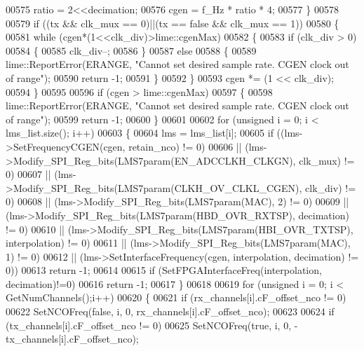 \begin{DoxyCode}
00575         ratio = 2<<decimation;
00576         cgen = f\_Hz * ratio * 4;
00577     \}
00578 
00579     \textcolor{keywordflow}{if} ((tx && clk\_mux == 0)||(tx == \textcolor{keyword}{false} && clk\_mux == 1))
00580     \{
00581         \textcolor{keywordflow}{while} (cgen*(1<<clk\_div)>lime::cgenMax)
00582         \{
00583             \textcolor{keywordflow}{if} (clk\_div > 0)
00584             \{
00585                 clk\_div--;
00586             \}
00587             \textcolor{keywordflow}{else}
00588             \{
00589                lime::ReportError(ERANGE, \textcolor{stringliteral}{"Cannot set desired sample rate. CGEN clock out of range"});
00590                \textcolor{keywordflow}{return} -1;
00591             \}
00592         \}
00593         cgen *= (1 << clk\_div);
00594     \}
00595 
00596     \textcolor{keywordflow}{if} (cgen > lime::cgenMax)
00597     \{
00598         lime::ReportError(ERANGE, \textcolor{stringliteral}{"Cannot set desired sample rate. CGEN clock out of range"});
00599         \textcolor{keywordflow}{return} -1;
00600     \}
00601 
00602     \textcolor{keywordflow}{for} (\textcolor{keywordtype}{unsigned} i = 0; i < lms_list.size(); i++)
00603       \{
00604         lms = lms_list[i];
00605         \textcolor{keywordflow}{if} ((lms->SetFrequencyCGEN(cgen, retain\_nco) != 0)
00606         || (lms->Modify_SPI_Reg_bits(LMS7param(EN_ADCCLKH_CLKGN), clk\_mux) != 0)
00607         || (lms->Modify_SPI_Reg_bits(LMS7param(CLKH_OV_CLKL_CGEN), clk\_div) != 0)
00608         || (lms->Modify_SPI_Reg_bits(LMS7param(MAC), 2) != 0)
00609         || (lms->Modify_SPI_Reg_bits(LMS7param(HBD_OVR_RXTSP), decimation) != 0)
00610         || (lms->Modify_SPI_Reg_bits(LMS7param(HBI_OVR_TXTSP), interpolation) != 0)
00611         || (lms->Modify_SPI_Reg_bits(LMS7param(MAC), 1) != 0)
00612         || (lms->SetInterfaceFrequency(cgen, interpolation, decimation) != 0))
00613       \textcolor{keywordflow}{return} -1;
00614 
00615          \textcolor{keywordflow}{if} (SetFPGAInterfaceFreq(interpolation, decimation)!=0)
00616              \textcolor{keywordflow}{return} -1;
00617       \}
00618 
00619     \textcolor{keywordflow}{for} (\textcolor{keywordtype}{unsigned} i = 0; i < GetNumChannels();i++)
00620     \{
00621         \textcolor{keywordflow}{if} (rx_channels[i].cF\_offset\_nco != 0)
00622            SetNCOFreq(\textcolor{keyword}{false}, i, 0, rx_channels[i].cF\_offset\_nco);
00623 
00624         \textcolor{keywordflow}{if} (tx_channels[i].cF\_offset\_nco != 0)
00625            SetNCOFreq(\textcolor{keyword}{true}, i, 0, -tx_channels[i].cF\_offset\_nco);

\end{DoxyCode}
